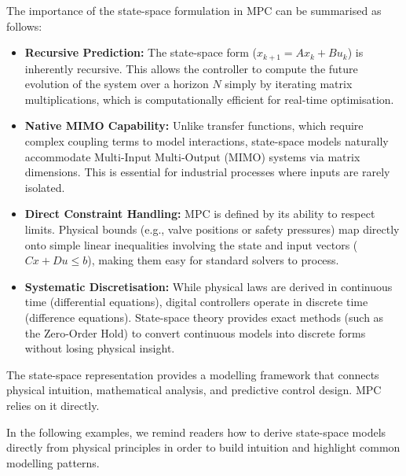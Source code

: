 The importance of the state-space formulation in MPC can be summarised as follows:
\begin{itemize}
	\item \textbf{Recursive Prediction:} The state-space form ($x_{k+1} = Ax_k + Bu_k$) is inherently recursive. This allows the controller to compute the future evolution of the system over a horizon $N$ simply by iterating matrix multiplications, which is computationally efficient for real-time optimisation.
	
	\item \textbf{Native MIMO Capability:} Unlike transfer functions, which require complex coupling terms to model interactions, state-space models naturally accommodate Multi-Input Multi-Output (MIMO) systems via matrix dimensions. This is essential for industrial processes where inputs are rarely isolated.
	
	\item \textbf{Direct Constraint Handling:} MPC is defined by its ability to respect limits. Physical bounds (e.g., valve positions or safety pressures) map directly onto simple linear inequalities involving the state and input vectors ($Cx + Du \leq b$), making them easy for standard solvers to process.
	
	\item \textbf{Systematic Discretisation:} While physical laws are derived in continuous time (differential equations), digital controllers operate in discrete time (difference equations). State-space theory provides exact methods (such as the Zero-Order Hold) to convert continuous models into discrete forms without losing physical insight.
\end{itemize}

\medskip
The state-space representation provides a modelling framework that connects physical intuition, mathematical analysis, and predictive control design. MPC relies on it directly.

In the following examples, we remind readers how to derive state-space models directly from physical principles in order to build intuition and highlight common modelling patterns.


